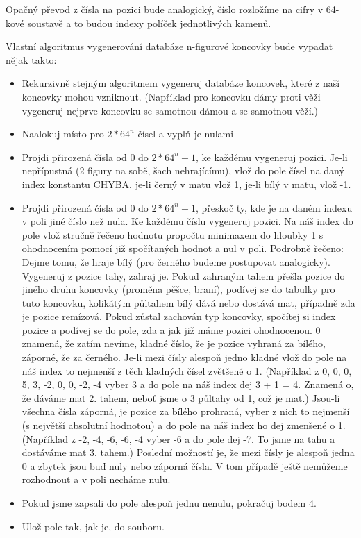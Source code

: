 \documentclass[11pt, titlepage]{article}
\begin{document}
Opačný převod z čísla na pozici bude analogický, číslo rozložíme na cifry v 64-kové soustavě a to budou indexy políček jednotlivých kamenů.

Vlastní algoritmus vygenerování databáze n-figurové koncovky bude vypadat nějak takto:
\begin{itemize}
	\item Rekurzivně stejným algoritmem vygeneruj databáze koncovek, které z naší koncovky mohou vzniknout. (Například pro koncovku dámy proti věži vygeneruj nejprve koncovku se samotnou dámou a se samotnou věží.)
	\item Naalokuj místo pro \begin{math}2 * 64^n\end{math} čísel a vyplň je nulami
	\item Projdi přirozená čísla od 0 do \begin{math}2 * 64^n -1\end{math}, ke každému vygeneruj pozici. Je-li nepřípustná (2 figury na sobě, šach nehrajícímu), vlož do pole čísel na daný index konstantu CHYBA, je-li černý v matu vlož 1, je-li bílý v matu, vlož -1.
	\item Projdi přirozená čísla od 0 do \begin{math}2 * 64^n -1\end{math}, přeskoč ty, kde je na daném indexu v poli jiné číslo než nula. Ke každému číslu vygeneruj pozici. Na náš index do pole vlož stručně řečeno hodnotu propočtu minimaxem do hloubky 1 s ohodnocením pomocí již spočítaných hodnot a nul v poli. Podrobně řečeno: Dejme tomu, že hraje bílý (pro černého budeme postupovat analogicky). Vygeneruj z pozice tahy, zahraj je. Pokud zahraným tahem přešla pozice do jiného druhu koncovky (proměna pěšce, braní), podívej se do tabulky pro tuto koncovku, kolikátým půltahem bílý dává nebo dostává mat, případně zda je pozice remízová. Pokud zůstal zachován typ koncovky, spočítej si index pozice a podívej se do pole, zda a jak již máme pozici ohodnocenou. 0 znamená, že zatím nevíme, kladné číslo, že je pozice vyhraná za bílého, záporné, že za černého. Je-li mezi čísly alespoň jedno kladné vlož do pole na náš index to nejmenší z těch kladných čísel zvětšené o 1. (Například z 0, 0, 0, 5, 3, -2, 0, 0, -2, -4 vyber 3 a do pole na náš index dej 3 + 1 = 4. Znamená o, že dáváme mat 2. tahem, neboť jsme o 3 půltahy od 1, což je mat.) Jsou-li všechna čísla záporná, je pozice za bílého prohraná, vyber z nich to nejmenší (s největší absolutní hodnotou) a do pole na náš index ho dej zmenšené o 1. (Například z -2, -4, -6, -6, -4 vyber -6 a do pole dej -7. To jsme na tahu a dostáváme mat 3. tahem.) Poslední možností je, že mezi čísly je alespoň jedna 0 a zbytek jsou buď nuly nebo záporná čísla. V tom případě ještě nemůžeme rozhodnout a v poli necháme nulu.
	\item Pokud jsme zapsali do pole alespoň jednu nenulu, pokračuj bodem 4.
	\item Ulož pole tak, jak je, do souboru.
\end{itemize}
\end{document}
